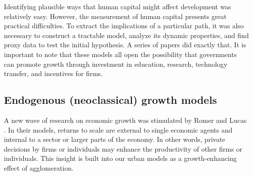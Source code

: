 





Identifying plausible ways that human capital might affect development was relatively easy. However, the measurement of human capital presents great practical difficulties. To extract the implications of a particular path, it was also necessary to construct a tractable model, analyze its dynamic properties, and find proxy data to test the initial hypothesis.   A series of papers did exactly that. It is important to note that these models all open the possibility that governments can promote growth through investment in education, research, technology transfer, and incentives for firms.

\subsection{Endogenous (neoclassical) growth models}
A new wave of research on economic growth was stimulated by Romer \cite{romerIncreasingReturnsLongRun1986} and Lucas \cite{lucasMechanicsEconomicDevelopment1988}. In their models, returns to scale are external to single economic agents and internal to a sector or larger parts of the economy. In other words, private decisions by firms or individuals may enhance the productivity of other firms or individuals. This insight is built into our urban models as a growth-enhancing effect of agglomeration. 

